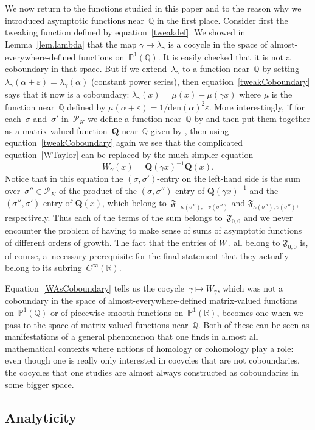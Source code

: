 \documentclass[pdftex]{sigma}
\numberwithin{equation}{section}
\def\BP{\mathbb P}
\def\BJ{\mathbb J}
\def\calP{\mathcal P}
\def\calP{\mathcal P}
\def\l{\lambda}
\def\k{\kappa}
\def\Phih{\widehat\Phi}
\def\a{\alpha}
\def\l{\lambda}
\def\R{\mathbb R}
\def\Q{\mathbb Q}
\def\i{^{-1}}
\def\a{\alpha}
\def\l{\lambda}
\def\s{\sigma}
\def\v{\varepsilon}
\def\den{\mathrm{den}}
\def\BJ{{\mathbf Q}} %
\def\be{\begin{equation}}
\def\ee{\end{equation}}
\def\g{\gamma}
\def\bPhih{\mathbf{\Phih}}
\def\FF{\mathfrak F}
\begin{document}
We now return to the functions studied in this paper and to the reason why we
introduced asymptotic functions near~$\Q$ in the first place. Consider first the
tweaking function defined by equation~\eqref{tweakdef}. We showed in
Lemma~\ref{lem.lambda} that the map $\g\mapsto\l_\g$ is a cocycle in the space of
almost-everywhere-defined functions on~$\BP^1(\Q)$. It is easily checked that it is
not a coboundary in that space. But if we extend~$\l_\g$ to a function near~$\Q$ by
setting $\l_\g(\a+\v)=\l_\g(\a)$ (constant power series), then
equation~\eqref{tweakCoboundary} says that it now is a coboundary:
$\l_\g(x)=\mu(x)-\mu(\g x)$ where $\mu$ is the function near~$\Q$ defined by
$\mu(\a+\v)=1/\den(\a)^2\v $. More interestingly, if for each~$\s$ and~$\s'$
in~$\calP_K$ we define a function near~$\Q$ by
\smash{$Q^{(K,\s,\s')}(\a-\hbar)=\Phih_\a^{(K,\s,\s')}(h)$} and then put them together as a
matrix-valued function~$\BJ$ near~$\Q$ given by \smash{$\BJ(\a-\hbar)=\bPhih^{(K)}_\a(h)$},
then using equation~\eqref{tweakCoboundary} again we see that the complicated
equation~\eqref{WTaylor} can be replaced by the much simpler equation
\be
\label{WAsCoboundary}
W_\g(x) = \BJ(\g x)\i \BJ(x) .
\ee
Notice that in this equation the $(\s,\s')$-entry on the left-hand side is the sum
over~$\s''\in\calP_K$ of the product of the $(\s,\s'')$-entry of $\BJ(\g x)\i$ and the
$(\s'',\s')$-entry of $\BJ(x)$, which belong to~$\FF_{-\k(\s''),-v(\s'')}$ and
$\FF_{\k(\s''),v(\s'')}$, respectively. Thus each of the terms of the sum belongs
to~$\FF_{0,0}$ and we never encounter the problem of having to make sense of sums of
asymptotic functions of different orders of growth. The fact that the entries
of $W_\g$ all belong to $\FF_{0,0}$ is, of course, a~necessary prerequisite for the
final statement that they actually belong to its subring~$C^\infty(\R)$.

Equation~\eqref{WAsCoboundary} tells us the cocycle~$\g\mapsto W_\g$, which was
not a coboundary in the space of almost-everywhere-defined matrix-valued functions
on~$\BP^1(\Q)$ or of piecewise smooth functions on~$\BP^1(\R)$, becomes one when we
pass to the space of matrix-valued functions near~$\Q$. Both of these can be seen
as manifestations of a general phenomenon that one finds in almost all mathematical
contexts where notions of homology or cohomology play a role: even though one is
really only interested in cocycles that are not coboundaries, the cocycles that one
studies are almost always constructed as coboundaries in some bigger space.

\subsection{Analyticity}
\label{sub.holomorphic}
\end{document}
